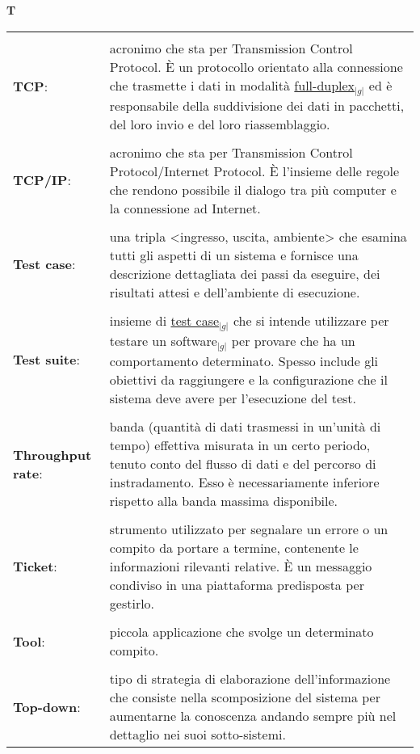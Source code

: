 \hfill\Huge{\textbf{T}}\\
\normalsize
\label{tabVers}
	\begin{longtable}{p{} p{}} 
	    \toprule
	    \\
	    \textbf{TCP}:		&	acronimo che sta per Transmission Control Protocol. \`E un protocollo orientato alla connessione che trasmette i dati in modalità \underline{full-duplex}$_{|g|}$ ed è 
						responsabile della suddivisione dei dati in pacchetti, del loro invio e del loro riassemblaggio.\\
	    \\
	    \textbf{TCP/IP}:		&	acronimo che sta per Transmission Control Protocol/Internet Protocol. \`E l’insieme delle regole che rendono possibile il dialogo tra più computer e la connessione ad Internet.\\
	    \\
	    \textbf{Test case}:		&	una tripla <ingresso, uscita, ambiente> che esamina tutti gli aspetti di un sistema e fornisce una descrizione dettagliata dei passi da eseguire, dei risultati attesi e dell’ambiente di esecuzione.\\
	    \\
	    \textbf{Test suite}:	&	insieme di \underline{test case}$_{|g|}$ che si intende utilizzare per testare un software$_{|g|}$ per provare che ha un comportamento determinato. Spesso include gli obiettivi da raggiungere e 
						la configurazione che il sistema deve avere per l’esecuzione del test.\\
	    \\
	    \textbf{Throughput rate}:	&	banda (quantità di dati trasmessi in un’unità di tempo) effettiva misurata in un certo periodo, tenuto conto del flusso di dati e del percorso di instradamento. Esso è necessariamente inferiore 
						rispetto alla banda massima disponibile. \\
	    \\
	    \textbf{Ticket}:		&	strumento utilizzato per segnalare un errore o un compito da portare a termine, contenente le informazioni rilevanti relative. \`E un messaggio condiviso in una piattaforma predisposta per gestirlo.\\
	    \\
	    \textbf{Tool}:		&	piccola applicazione che svolge un determinato compito.\\
	    \\
	    \textbf{Top-down}:		&	tipo di strategia di elaborazione dell'informazione che consiste nella scomposizione del sistema per aumentarne la conoscenza andando sempre più nel dettaglio nei suoi sotto-sistemi. 

\end{longtable}
